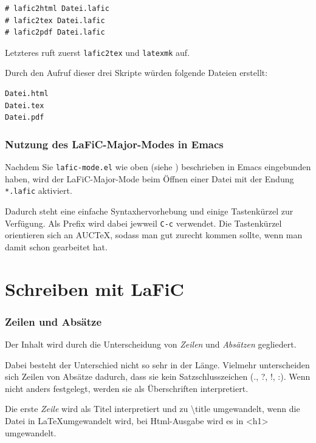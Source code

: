 \documentclass{scrartcl}
\begin{document}
\begin{verbatim}
# lafic2html Datei.lafic
# lafic2tex Datei.lafic
# lafic2pdf Datei.lafic

\end{verbatim}

Letzteres ruft zuerst \texttt{lafic2tex} und \texttt{latexmk} auf.

Durch den Aufruf dieser drei Skripte würden folgende Dateien
erstellt:

\begin{verbatim}
Datei.html
Datei.tex
Datei.pdf

\end{verbatim}

\section{Nutzung des LaFiC-Major-Modes in Emacs}

Nachdem Sie \texttt{lafic-mode.el} wie oben (siehe \xspace )
beschrieben in Emacs eingebunden haben, wird der
LaFiC-Major-Mode beim Öffnen einer Datei mit der Endung
\texttt{*.lafic} aktiviert.

\colorbox{grau}{\parbox{\linewidth}{%
Dadurch steht eine einfache Syntaxhervorhebung und einige
Tastenkürzel zur Verfügung. Als Prefix wird dabei jewweil
\texttt{C-c} verwendet. Die Tastenkürzel orientieren sich an AUCTeX,
sodass man gut zurecht kommen sollte, wenn man damit schon
gearbeitet hat.
}}

\part{Schreiben mit LaFiC}

\section{Zeilen und Absätze}

Der Inhalt wird durch die Unterscheidung von \emph{Zeilen} und
\emph{Absätzen} gegliedert.

Dabei besteht der Unterschied nicht so sehr in der
Länge. Vielmehr unterscheiden sich Zeilen von Absätze
dadurch, dass sie kein Satzschlusszeichen (., ?, !, :).
Wenn nicht anders festgelegt, werden sie als Überschriften
interpretiert.

Die erste \emph{Zeile} wird als Titel interpretiert und zu \textbackslash title
umgewandelt, wenn die Datei in \LaTeX umgewandelt wird, bei
Html-Ausgabe wird es in <h1> umgewandelt.
\end{document}
